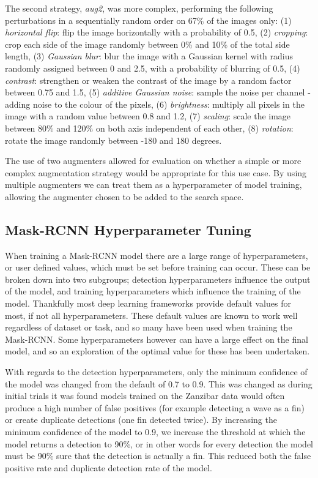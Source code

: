 The second strategy, \textit{aug2}, was more complex, performing the following perturbations in a sequentially random order on 67\% of the images only: (1) \textit{horizontal flip}: flip the image horizontally with a probability of 0.5, (2) \textit{cropping}: crop each side of the image randomly between 0\% and 10\% of the total side length, (3) \textit{Gaussian blur}: blur the image with a Gaussian kernel with radius randomly assigned between 0 and 2.5, with a probability of blurring of 0.5, (4) \textit{contrast}: strengthen or weaken the contrast of the image by a random factor between 0.75 and 1.5, (5) \textit{additive Gaussian noise}: sample the noise per channel - adding noise to the colour of the pixels, (6) \textit{brightness}: multiply all pixels in the image with a random value between 0.8 and 1.2, (7) \textit{scaling}: scale the image between 80\% and 120\% on both axis independent of each other, (8) \textit{rotation}: rotate the image randomly between -180 and 180 degrees. 

The use of two augmenters allowed for evaluation on whether a simple or more complex augmentation strategy would be appropriate for this use case. By using multiple augmenters we can treat them as a hyperparameter of model training, allowing the augmenter chosen to be added to the search space. 

\subsection{Mask-RCNN Hyperparameter Tuning}\label{ch:cetDet,sec:initialTesting,sub:hyperparameters}

When training a Mask-RCNN model there are a large range of hyperparameters, or user defined values, which must be set before training can occur. These can be broken down into two subgroups; detection hyperparameters influence the output of the model, and training hyperparameters which influence the training of the model. Thankfully most deep learning frameworks provide default values for most, if not all hyperparameters. These default values are known to work well regardless of dataset or task, and so many have been used when training the Mask-RCNN. Some hyperparameters however can have a large effect on the final model, and so an exploration of the optimal value for these has been undertaken. 

With regards to the detection hyperparameters, only the minimum confidence of the model was changed from the default of 0.7 to 0.9. This was changed as during initial trials it was found models trained on the Zanzibar data would often produce a high number of false positives (for example detecting a wave as a fin) or create duplicate detections (one fin detected twice). By increasing the minimum confidence of the model to 0.9, we increase the threshold at which the model returns a detection to 90\%, or in other words for every detection the model must be 90\% sure that the detection is actually a fin. This reduced both the false positive rate and duplicate detection rate of the model.

